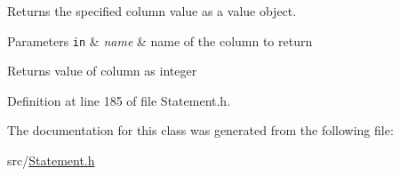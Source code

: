 Returns the specified column value as a value object. 


\begin{DoxyParams}[1]{Parameters}
\mbox{\tt in}  & {\em name} & name of the column to return \\
\hline
\end{DoxyParams}
\begin{DoxyReturn}{Returns}
value of column as integer 
\end{DoxyReturn}


Definition at line 185 of file Statement.\-h.



The documentation for this class was generated from the following file\-:\begin{DoxyCompactItemize}
\item 
src/\hyperlink{a00032}{Statement.\-h}\end{DoxyCompactItemize}
